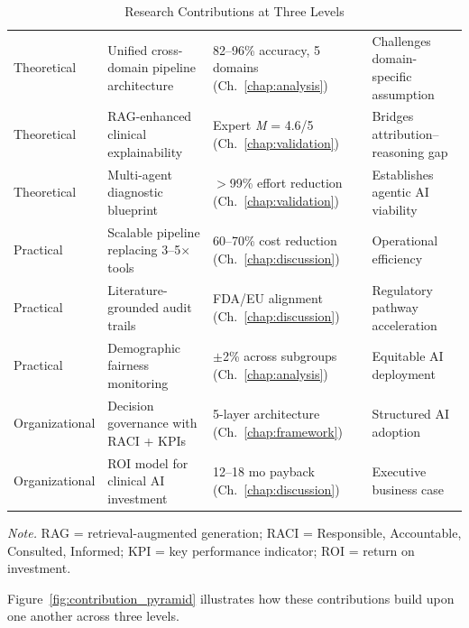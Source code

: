 \begin{table}[H]
\small
\tablestripes
\begin{tabularx}{\textwidth}{L L L L}
\toprule
{} &  &  &  \\
\midrule
Theoretical & Unified cross-domain pipeline architecture & 82--96\% accuracy, 5 domains (Ch.~\ref{chap:analysis}) & Challenges domain-specific assumption \\
\addlinespace
Theoretical & RAG-enhanced clinical explainability & Expert \textit{M} = 4.6/5 (Ch.~\ref{chap:validation}) & Bridges attribution--reasoning gap \\
\addlinespace
Theoretical & Multi-agent diagnostic blueprint & $>$99\% effort reduction (Ch.~\ref{chap:validation}) & Establishes agentic AI viability \\
\addlinespace
Practical & Scalable pipeline replacing 3--5$\times$ tools & 60--70\% cost reduction (Ch.~\ref{chap:discussion}) & Operational efficiency \\
\addlinespace
Practical & Literature-grounded audit trails & FDA/EU alignment (Ch.~\ref{chap:discussion}) & Regulatory pathway acceleration \\
\addlinespace
Practical & Demographic fairness monitoring & $\pm$2\% across subgroups (Ch.~\ref{chap:analysis}) & Equitable AI deployment \\
\addlinespace
Organizational & Decision governance with RACI + KPIs & 5-layer architecture (Ch.~\ref{chap:framework}) & Structured AI adoption \\
\addlinespace
Organizational & ROI model for clinical AI investment & 12--18 mo payback (Ch.~\ref{chap:discussion}) & Executive business case \\
\bottomrule
\end{tabularx}
\caption{Research Contributions at Three Levels}
\label{tab:research_contributions}
\vspace{0.5em}\noindent\textit{Note.} RAG = retrieval-augmented generation; RACI = Responsible, Accountable, Consulted, Informed; KPI = key performance indicator; ROI = return on investment.
\end{table}

Figure~\ref{fig:contribution_pyramid} illustrates how these contributions build upon one another across three levels.

